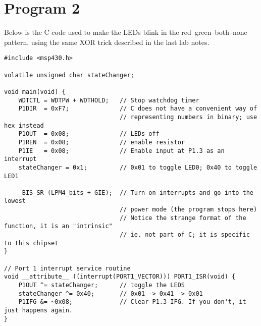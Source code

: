 \documentclass[letterpaper]{article}
\begin{document}
	\section{Program 2}
		Below is the C code used to make the LEDs blink in the red--green--both--none pattern, using the same XOR trick described in the last lab notes.
		\begin{verbatim}
#include <msp430.h>

volatile unsigned char stateChanger;

void main(void) {
    WDTCTL = WDTPW + WDTHOLD;   // Stop watchdog timer
    P1DIR  = 0xF7;              // C does not have a convenient way of
                                // representing numbers in binary; use hex instead
    P1OUT  = 0x08;              // LEDs off
    P1REN  = 0x08;              // enable resistor
    P1IE   = 0x08;              // Enable input at P1.3 as an interrupt
    stateChanger = 0x1;         // 0x01 to toggle LED0; 0x40 to toggle LED1

    _BIS_SR (LPM4_bits + GIE);  // Turn on interrupts and go into the lowest
                                // power mode (the program stops here)
                                // Notice the strange format of the function, it is an "intrinsic"
                                // ie. not part of C; it is specific to this chipset
}

// Port 1 interrupt service routine
void __attribute__ ((interrupt(PORT1_VECTOR))) PORT1_ISR(void) {
    P1OUT ^= stateChanger;      // toggle the LEDS
    stateChanger ^= 0x40;       // 0x01 -> 0x41 -> 0x01
    P1IFG &= ~0x08;             // Clear P1.3 IFG. If you don't, it just happens again.
}
		\end{verbatim}
	
\end{document}
